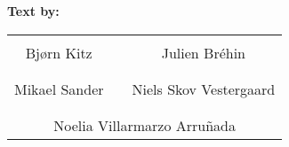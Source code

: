 \textbf{Text by:}\\
\vspace{-12 pt}
\begin{table}[H]
	\centering
		\begin{tabular}{c c c}
			\underline{\phantom{JAERJAERJAERJAERGO}} & \phantom{cookies} & \underline{\phantom{JAERJAERJAERJAERGO}} \\
			Bjørn Kitz			& \phantom{cookies} & Julien Br\'ehin		\\
			&&\\
			\underline{\phantom{JAERJAERJAERJAERGO}} & \phantom{cookies} & \underline{\phantom{JAERJAERJAERJAERGO}} \\
			Mikael Sander			& \phantom{cookies} & Niels Skov Vestergaard		\\
			&&\\
	    \multicolumn{3}{c}{\underline{\phantom{JAERJAERJAERJAERGO}}}\\
	    \multicolumn{3}{c}{Noelia Villarmarzo Arruñada}\\				
		\end{tabular}
\end{table}
\pagebreak